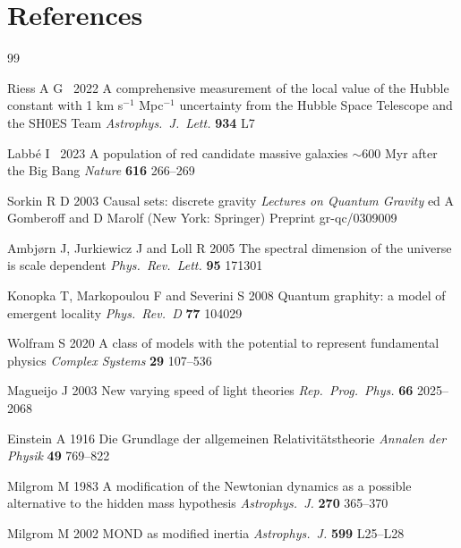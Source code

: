 \documentclass[12pt]{iopart}
\begin{document}
\section*{References}
\begin{thebibliography}{99}


Riess A G \etal\ 2022
A comprehensive measurement of the local value of the Hubble constant with
1 km s\(^{-1}\) Mpc\(^{-1}\) uncertainty from the Hubble Space Telescope and the SH0ES Team
\textit{Astrophys.\ J.\ Lett.} \textbf{934} L7

Labb\'e I \etal\ 2023
A population of red candidate massive galaxies \(\sim 600\) Myr after the Big Bang
\textit{Nature} \textbf{616} 266--269


Sorkin R D 2003
Causal sets: discrete gravity
\textit{Lectures on Quantum Gravity}
ed A Gomberoff and D Marolf
(New York: Springer)
Preprint gr-qc/0309009

Ambj{\o}rn J, Jurkiewicz J and Loll R 2005
The spectral dimension of the universe is scale dependent
\textit{Phys.\ Rev.\ Lett.} \textbf{95} 171301

Konopka T, Markopoulou F and Severini S 2008
Quantum graphity: a model of emergent locality
\textit{Phys.\ Rev.\ D} \textbf{77} 104029

Wolfram S 2020
A class of models with the potential to represent fundamental physics
\textit{Complex Systems} \textbf{29} 107--536


Magueijo J 2003
New varying speed of light theories
\textit{Rep.\ Prog.\ Phys.} \textbf{66} 2025--2068

Einstein A 1916
Die Grundlage der allgemeinen Relativit\"atstheorie
\textit{Annalen der Physik} \textbf{49} 769--822


Milgrom M 1983
A modification of the Newtonian dynamics as a possible alternative to the hidden mass hypothesis
\textit{Astrophys.\ J.} \textbf{270} 365--370

Milgrom M 2002
MOND as modified inertia
\textit{Astrophys.\ J.} \textbf{599} L25--L28


\end{thebibliography}
\end{document}
